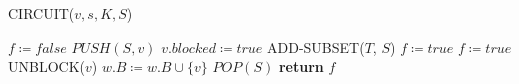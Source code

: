 \begin{algorithm}[H]
    \caption{CIRCUIT($v, s, K, S$)}\label{alg:circuit}
    \begin{algorithmic}[1]
        \State $f \coloneqq false$
        \State $PUSH(S, v)$
        \State $v.blocked \coloneqq true$
                \State ADD-SUBSET($T$, $S$)  
                \State $f \coloneqq true$
             \State $f \coloneqq true$ \EndIf
            \EndIf
        \EndFor
         UNBLOCK($v$)
        \Else
                \State $w.B \coloneqq w.B \cup \{v\}$
            \EndFor
        \EndIf
        \State $POP(S)$ 
        \State \textbf{return} $f$
    \end{algorithmic}
\end{algorithm}

